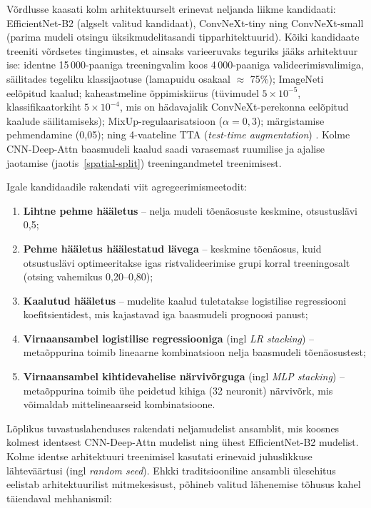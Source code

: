     Võrdlusse kaasati kolm arhitektuurselt erinevat neljanda liikme kandidaati: EfficientNet-B2 (algselt valitud kandidaat), ConvNeXt-tiny ning ConvNeXt-small (parima mudeli otsingu üksikmudelitasandi tipparhitektuurid). Kõiki kandidaate treeniti võrdsetes tingimustes, et ainsaks varieeruvaks teguriks jääks arhitektuur ise: identne 15\,000-paaniga treeningvalim koos 4\,000-paaniga valideerimisvalimiga, säilitades tegeliku klassijaotuse (lamapuidu osakaal $\approx$ 75\%); ImageNeti eelõpitud kaalud; kaheastmeline õppimiskiirus (tüvimudel $5\times10^{-5}$, klassifikaatorkiht $5\times10^{-4}$, mis on hädavajalik ConvNeXt-perekonna eelõpitud kaalude säilitamiseks); MixUp-regulaarisatsioon ($\alpha=0{,}3$); märgistamise pehmendamine (0,05); ning 4-vaateline TTA (\textit{test-time augmentation}) \parencite{wang_aleatoric_2019}. Kolme CNN-Deep-Attn baasmudeli kaalud saadi varasemast ruumilise ja ajalise jaotamise (jaotis~\ref{spatial-split}) treeningandmetel treenimisest.

    Igale kandidaadile rakendati viit agregeerimismeetodit:
    \begin{enumerate}
        \item \textbf{Lihtne pehme hääletus} -- nelja mudeli tõenäosuste keskmine, otsustuslävi 0,5;
        \item \textbf{Pehme hääletus häälestatud lävega} -- keskmine tõenäosus, kuid otsustuslävi optimeeritakse igas ristvalideerimise grupi korral treeningosalt (otsing vahemikus 0,20--0,80);
        \item \textbf{Kaalutud hääletus} -- mudelite kaalud tuletatakse logistilise regressiooni koefitsientidest, mis kajastavad iga baasmudeli prognoosi panust;
        \item \textbf{Virnaansambel logistilise regressiooniga} (ingl \textit{LR stacking}) -- metaõppurina toimib lineaarne kombinatsioon nelja baasmudeli tõenäosustest;
        \item \textbf{Virnaansambel kihtidevahelise närvivõrguga} (ingl \textit{MLP stacking}) -- metaõppurina toimib ühe peidetud kihiga (32 neuronit) närvivõrk, mis võimaldab mittelineaarseid kombinatsioone.
    \end{enumerate}

    Lõplikus tuvastuslahenduses rakendati neljamudelist ansamblit, mis koosnes kolmest identsest CNN-Deep-Attn mudelist ning ühest EfficientNet-B2 mudelist. Kolme identse arhitektuuri treenimisel kasutati erinevaid juhuslikkuse lähteväärtusi (ingl \textit{random seed}). Ehkki traditsiooniline ansambli ülesehitus eelistab arhitektuurilist mitmekesisust, põhineb valitud lähenemise tõhusus kahel täiendaval mehhanismil:

